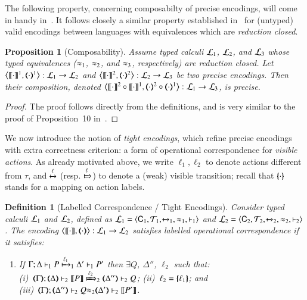 \documentclass[preprint,11pt]{elsarticle}
\newtheorem{definition}{Definition}[section]
\newtheorem{proposition}{Proposition}[section]
\begin{document}
{{%

The following property, concerning composabilty of precise encodings, will come in handy in~.
It follows closely a similar property established in~\cite{DBLP:journals/dc/Gorla10} for (untyped) valid encodings between languages with equivalences which are \emph{reduction closed}.

\begin{proposition}[Composability]%
	\label{pro:composition}
	Assume typed calculi $\tyl{L}_1$, $\tyl{L}_2$, and $\tyl{L}_3$ whose typed equivalences 
	($\wb_1$, $\wb_2$, and $\wb_3$, respectively) are reduction closed. 
	Let %
	$\enco{\map{\cdot}^{1}, \mapt{\cdot}^{1}%
	}: \tyl{L}_1 \to \tyl{L}_2$
	and 
	$\enco{\map{\cdot}^{2}, \mapt{\cdot}^{2}%
	}: \tyl{L}_2 \to \tyl{L}_3$
	be two precise %
	encodings.
	Then their composition, denoted 
	$\enco{\map{\cdot}^{2} \circ \map{\cdot}^{1}, \mapt{\cdot}^{2} \circ \mapt{\cdot}^{1} %
	}: \tyl{L}_1 \to \tyl{L}_3$,
	is precise. 
\end{proposition}

\begin{proof}
The proof follows directly from the definitions, and is very similar to the proof of Proposition~10 in~\cite{DBLP:journals/dc/Gorla10}.
\end{proof}

We now introduce the notion of \emph{tight encodings}, which refine precise encodings with 
extra correctness criterion: a form of operational correspondence 
for \emph{visible actions}. 
As already motivated above, 
we write $\ell_1, \ell_2$ to denote  
actions different from $\tau$,
and  $\hby{\ell}$ (resp. $\Hby{\ell}$) to denote a (weak) visible transition;
recall that $\mapa{\cdot}$ stands for a mapping 
on action labels.

\begin{definition}[Labelled Correspondence / Tight Encodings]%
\label{def:lopco}
       Consider typed calculi $\tyl{L}_1$ and  $\tyl{L}_2$, defined as 
        $\tyl{L}_1=\calc{\CAL_1}{{\cal{T}}_1}{\hby{{~}}_1}{\wb_1}{\proves_1}$
       and $\tyl{L}_2=\calc{\CAL_2}{{\cal{T}}_2}{\hby{{~}}_2}{\wb_2}{\proves_2}$.
The encoding $\enco{\map{\cdot}, \mapt{\cdot}}: \tyl{L}_1 \to \tyl{L}_2$ satisfies
\emph{labelled operational correspondence}
if it satisfies:
	\begin{enumerate}[1.]
			\item
					If		$\stytraargi{\Gamma}{\ell_1}{\Delta}{P}{\Delta'}{P'}{1}{1}$
					then	$\exists Q$, $\Delta''$, $\ell_2$ such that: \\ 
							(i)~$\wtytraargi{\mapt{\Gamma}}{\ell_2}{\mapt{\Delta}}{\map{P}}{\mapt{\Delta''}}{Q}{2}{2}$; 
							(ii)~$\ell_2 = \mapa{\ell_1}$;  and \\
							(iii)~${\mapt{\Gamma}};{\mapt{\Delta''}}\proves_2 {Q}{\wb_2}{\mapt{\Delta'}}\proves_2 {\map{P'}}$.
				

\end{enumerate}
\end{definition}}}
\end{document}
